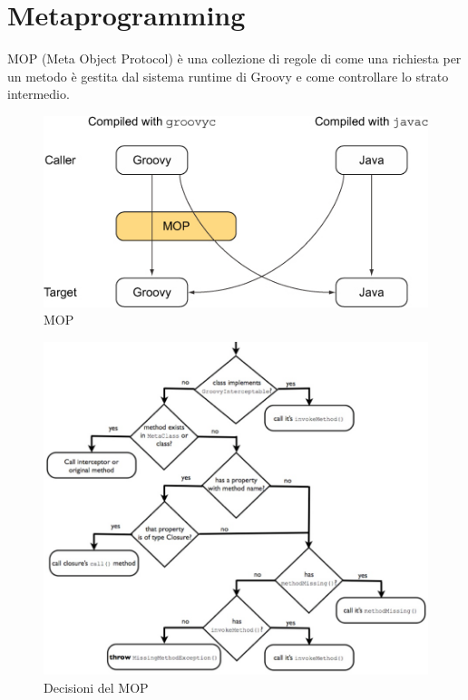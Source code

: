 \documentclass[11pt,a4paper]{book}
\begin{document}
\chapter{Metaprogramming}
MOP (Meta Object Protocol) è una collezione di regole di come una richiesta per un metodo è gestita dal sistema runtime di Groovy e come controllare lo strato intermedio.
\begin{figure}[h!]
	\begin{center}
		\includegraphics[scale=0.6]{img/002.jpg}
		\caption{MOP}
		\label{fig: 002}
	\end{center}
\end{figure}

\begin{figure}[h!]
	\begin{center}
		\includegraphics[scale=0.5]{img/003.png}
		\caption{Decisioni del MOP}
		\label{fig: 003}
	\end{center}
\end{figure}
\end{document}
